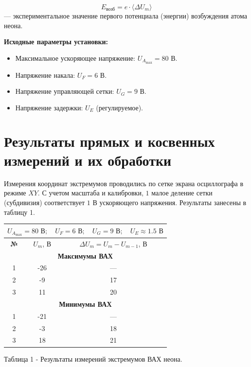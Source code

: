 \documentclass[a4paper,12pt]{article}
\begin{document}
\begin{equation}
E_{\text{возб}} = e \cdot \langle \Delta U_m \rangle \tag{3}
\end{equation}
— экспериментальное значение первого потенциала (энергии) возбуждения атома неона.

\vspace{0.5cm}
\textbf{Исходные параметры установки:}
\begin{itemize}
    \item Максимальное ускоряющее напряжение: $U_{A_{\text{max}}} = 80$ В.
    \item Напряжение накала: $U_F = 6$ В.
    \item Напряжение управляющей сетки: $U_G = 9$ В.
    \item Напряжение задержки: $U_E$ (регулируемое).
\end{itemize}

\section{Результаты прямых и косвенных измерений и их обработки}

Измерения координат экстремумов проводились по сетке экрана осциллографа в режиме $XY$. С учетом масштаба и калибровки, $1$ малое деление сетки (субдивизия) соответствует $1$ В ускоряющего напряжения. Результаты занесены в таблицу 1.

\begin{center}
\begin{tabular}{|c|c|c|}
\hline
\multicolumn{3}{|c|}{$U_{A_{\text{max}}} = 80 \text{ В}; \quad U_F = 6 \text{ В}; \quad U_G = 9 \text{ В}; \quad U_E \approx 1.5 \text{ В}$} \\ \hline
\textbf{№} & $U_m$, В & $\Delta U_m = U_m - U_{m-1}$, В \\ \hline
\multicolumn{3}{|c|}{\textbf{Максимумы ВАХ}} \\ \hline
1 & -26 & — \\ \hline
2 & -9 & 17 \\ \hline
3 & 11 & 20 \\ \hline
\multicolumn{3}{|c|}{\textbf{Минимумы ВАХ}} \\ \hline
1 & -21 & — \\ \hline
2 & -3 & 18 \\ \hline
3 & 18 & 21 \\ \hline
\end{tabular}

\medskip
Таблица 1 - Результаты измерений экстремумов ВАХ неона.
\end{center}
\end{document}
